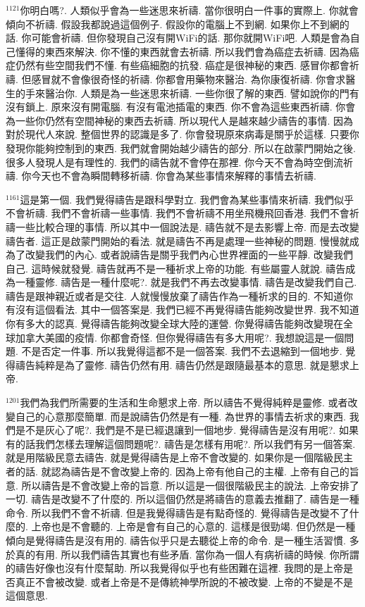 \documentclass{book}
\begin{document}
$^{1121}$你明白嗎?.
人類似乎會為一些迷思來祈禱.
當你很明白一件事的實際上.
你就會傾向不祈禱.
假設我都說過這個例子.
假設你的電腦上不到網.
如果你上不到網的話.
你可能會祈禱.
但你發現自己沒有開WiFi的話.
那你就開WiFi吧.
人類是會為自己懂得的東西來解決.
你不懂的東西就會去祈禱.
所以我們會為癌症去祈禱.
因為癌症仍然有些空間我們不懂.
有些癌細胞的抗發.
癌症是很神秘的東西.
感冒你都會祈禱.
但感冒就不會像很奇怪的祈禱.
你都會用藥物來醫治.
為你康復祈禱.
你會求醫生的手來醫治你.
人類是為一些迷思來祈禱.
一些你很了解的東西.
譬如說你的門有沒有鎖上.
原來沒有開電腦.
有沒有電池插電的東西.
你不會為這些東西祈禱.
你會為一些你仍然有空間神秘的東西去祈禱.
所以現代人是越來越少禱告的事情.
因為對於現代人來說.
整個世界的認識是多了.
你會發現原來病毒是關乎於這樣.
只要你發現你能夠控制到的東西.
我們就會開始越少禱告的部分.
所以在啟蒙門開始之後.
很多人發現人是有理性的.
我們的禱告就不會停在那裡.
你今天不會為時空倒流祈禱.
你今天也不會為瞬間轉移祈禱.
你會為某些事情來解釋的事情去祈禱.

$^{1161}$這是第一個.
我們覺得禱告是跟科學對立.
我們會為某些事情來祈禱.
我們似乎不會祈禱.
我們不會祈禱一些事情.
我們不會祈禱不用坐飛機飛回香港.
我們不會祈禱一些比較合理的事情.
所以其中一個說法是.
禱告就不是去影響上帝.
而是去改變禱告者.
這正是啟蒙門開始的看法.
就是禱告不再是處理一些神秘的問題.
慢慢就成為了改變我們的內心.
或者說禱告是關乎我們內心世界裡面的一些平靜.
改變我們自己.
這時候就發覺.
禱告就再不是一種祈求上帝的功能.
有些屬靈人就說.
禱告成為一種靈修.
禱告是一種什麼呢?.
就是我們不再去改變事情.
禱告是改變我們自己.
禱告是跟神親近或者是交往.
人就慢慢放棄了禱告作為一種祈求的目的.
不知道你有沒有這個看法.
其中一個答案是.
我們已經不再覺得禱告能夠改變世界.
我不知道你有多大的認真.
覺得禱告能夠改變全球大陸的運營.
你覺得禱告能夠改變現在全球加拿大美國的疫情.
你都會奇怪.
但你覺得禱告有多大用呢?.
我想說這是一個問題.
不是否定一件事.
所以我覺得這都不是一個答案.
我們不去退縮到一個地步.
覺得禱告純粹是為了靈修.
禱告仍然有用.
禱告仍然是跟隨最基本的意思.
就是懇求上帝.

$^{1201}$我們為我們所需要的生活和生命懇求上帝.
所以禱告不覺得純粹是靈修.
或者改變自己的心意那麼簡單.
而是說禱告仍然是有一種.
為世界的事情去祈求的東西.
我們是不是灰心了呢?.
我們是不是已經退讓到一個地步.
覺得禱告是沒有用呢?.
如果有的話我們怎樣去理解這個問題呢?.
禱告是怎樣有用呢?.
所以我們有另一個答案.
就是用階級民意去禱告.
就是覺得禱告是上帝不會改變的.
如果你是一個階級民主者的話.
就認為禱告是不會改變上帝的.
因為上帝有他自己的主權.
上帝有自己的旨意.
所以禱告是不會改變上帝的旨意.
所以這是一個很階級民主的說法.
上帝安排了一切.
禱告是改變不了什麼的.
所以這個仍然是將禱告的意義去推翻了.
禱告是一種命令.
所以我們不會不祈禱.
但是我覺得禱告是有點奇怪的.
覺得禱告是改變不了什麼的.
上帝也是不會聽的.
上帝是會有自己的心意的.
這樣是很勁竭.
但仍然是一種傾向是覺得禱告是沒有用的.
禱告似乎只是去聽從上帝的命令.
是一種生活習慣.
多於真的有用.
所以我們禱告其實也有些矛盾.
當你為一個人有病祈禱的時候.
你所謂的禱告好像也沒有什麼幫助.
所以我覺得似乎也有些困難在這裡.
我問的是上帝是否真正不會被改變.
或者上帝是不是傳統神學所說的不被改變.
上帝的不變是不是這個意思.
\end{document}
